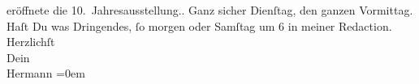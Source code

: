 \begin{ledgroupsized}[t]{13cm}
{{{                  eröffnete die 10. Jahresausstellung.}}}\label{K_L01102_2h}. Ganz sicher Dienſtag,
               den ganzen Vormittag. Haſt Du was Dringendes, ſo morgen oder Samſtag um
               6 in meiner Redaction.\pend
           \pstart
           Herzlichſt{\\[\baselineskip]}Dein{\\[\baselineskip]}\spacefill\mbox{Hermann}\pend
           \leftskip=0em{}\endnumbering{}\end{ledgroupsized}  \newcommand{\dateiname}{L01102}\newcommand{\titel}{Hermann Bahr an Arthur Schnitzler, [13. 3.? 1901]}\newcommand{\editorInnen}{ Kurt Ifkovits,  Martin Anton Müller}
            \footnotesize
\begin{ledgroupsized}[t]{11.5cm}
\end{ledgroupsized}
         
      